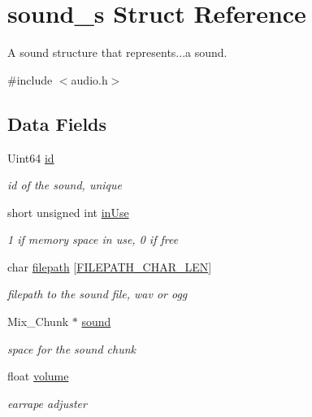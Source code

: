 \hypertarget{structsound__s}{}\section{sound\+\_\+s Struct Reference}
\label{structsound__s}


A sound structure that represents...a sound.  




{\ttfamily \#include $<$audio.\+h$>$}

\subsection*{Data Fields}
\begin{DoxyCompactItemize}
\item 
Uint64 \hyperlink{structsound__s_a4158e9a3af9337e59f9b8de984c0efba}{id}
\begin{DoxyCompactList}\small\item\em id of the sound, unique \end{DoxyCompactList}\item 
short unsigned int \hyperlink{structsound__s_a13159f6b47122dc47eb11b1653a1663a}{in\+Use}
\begin{DoxyCompactList}\small\item\em 1 if memory space in use, 0 if free \end{DoxyCompactList}\item 
char \hyperlink{structsound__s_aa860b866620309ee03358dbb835ca4d7}{filepath} \mbox{[}\hyperlink{audio_8h_a5281214b81f606f6f569328db01cbbe6}{F\+I\+L\+E\+P\+A\+T\+H\+\_\+\+C\+H\+A\+R\+\_\+\+L\+EN}\mbox{]}
\begin{DoxyCompactList}\small\item\em filepath to the sound file, wav or ogg \end{DoxyCompactList}\item 
Mix\+\_\+\+Chunk $\ast$ \hyperlink{structsound__s_a0bb45d52afdd032f48e17a8519361d54}{sound}
\begin{DoxyCompactList}\small\item\em space for the sound chunk \end{DoxyCompactList}\item 
float \hyperlink{structsound__s_a016abda2855c77dcc1630f9d2f9f8d18}{volume}
\begin{DoxyCompactList}\small\item\em earrape adjuster \end{DoxyCompactList}\item 

\end{DoxyCompactItemize}
